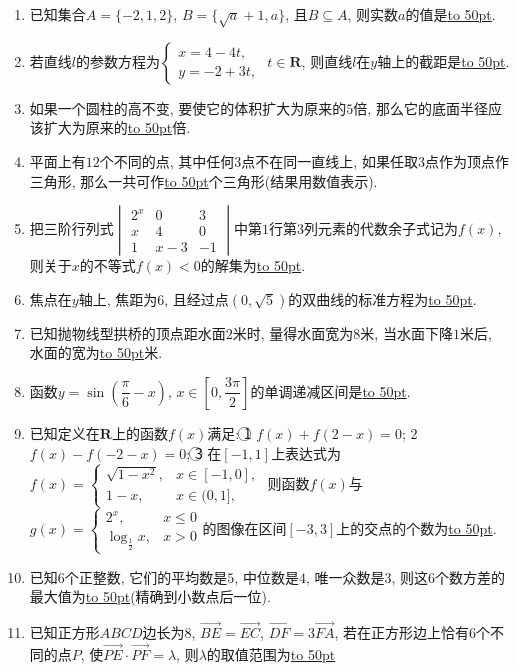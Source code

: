 \documentclass[10pt,a4paper]{article}
\newcommand{\blank}[1]{\underline{\hbox to #1pt{}}}
\begin{document}
\begin{enumerate}[1.]


\item 已知集合$A=\{-2,1,2\}$, $B=\{\sqrt a+1,a\}$, 且$B\subseteq A$, 则实数$a$的值是\blank{50}.
\item 若直线$l$的参数方程为$\begin{cases} x=4-4t, \\ y=-2+3t, \end{cases}$ $t\in \mathbf{R}$, 则直线$l$在$y$轴上的截距是\blank{50}.
\item 如果一个圆柱的高不变, 要使它的体积扩大为原来的$5$倍, 那么它的底面半径应该扩大为原来的\blank{50}倍.
\item 平面上有$12$个不同的点, 其中任何$3$点不在同一直线上, 如果任取$3$点作为顶点作三角形, 那么一共可作\blank{50}个三角形(结果用数值表示).
\item 把三阶行列式$\begin{vmatrix} 2^x & 0 & 3  \\x & 4 & 0  \\1 & x-3 & -1  \end{vmatrix}$中第$1$行第$3$列元素的代数余子式记为$f(x)$, 则关于$x$的不等式$f(x)<0$的解集为\blank{50}.
\item 焦点在$y$轴上, 焦距为$6$, 且经过点$(0,\sqrt 5)$的双曲线的标准方程为\blank{50}.
\item 已知抛物线型拱桥的顶点距水面$2$米时, 量得水面宽为$8$米, 当水面下降$1$米后, 水面的宽为\blank{50}米.
\item 函数$y=\sin (\dfrac{\pi}6-x)$, $x\in [0,\dfrac{3\pi }2]$的单调递减区间是\blank{50}.
\item 已知定义在$\mathbf{R}$上的函数$f(x)$满足: \textcircled{1} $f(x)+f(2-x)=0$; \textcircled{2} $f(x)-f(-2-x)=0$; \textcircled{3} 在$[-1,1]$上表达式为$f(x)=\begin{cases} \sqrt{1-x^2}, & x\in [-1,0], \\ 1-x, & x\in (0,1], \end{cases}$ 则函数$f(x)$与$g(x)=\begin{cases} {2^x}, & x\le 0 \\ \log_\frac 12x, & x>0 \end{cases}$的图像在区间$[-3,3]$上的交点的个数为\blank{50}.
\item 已知$6$个正整数, 它们的平均数是$5$, 中位数是$4$, 唯一众数是$3$, 则这$6$个数方差的最大值为\blank{50}(精确到小数点后一位).
\item 已知正方形$ABCD$边长为$8$, $\overrightarrow{BE}=\overrightarrow{EC}$, $\overrightarrow{DF}=3\overrightarrow{FA}$, 若在正方形边上恰有$6$个不同的点$P$, 使$\overrightarrow{PE}\cdot \overrightarrow{PF}=\lambda$, 则$\lambda$的取值范围为\blank{50}

\end{enumerate}
\end{document}
